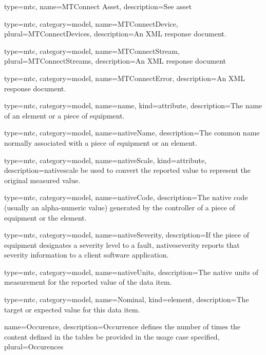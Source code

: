{
  type=mtc,
  name={MTConnect Asset},
  description={See \gls{asset}}
}


{
  type=mtc,
  category=model,
  name={MTConnectDevice},
  plural={MTConnectDevices},
  description={An XML response document.}
}


{
  type=mtc,
  category=model,
  name={MTConnectStream},
  plural={MTConnectStreams},
  description={An XML response document}
}

{
  type=mtc,
  category=model,
  name={MTConnectError},
  description={An XML response document.}
}


{
  type=mtc,
  category=model,
  name={name},
  kind={attribute},
  description={The name of an element or a piece of equipment.}
}


{
  type=mtc,
  category=model,
  name={nativeName},
  description={The common name normally associated with a piece of equipment or an element.}
}


{
  type=mtc,
  category=model,
  name={nativeScale},
  kind={attribute},
  description={\gls{nativescale} \MAY be used to convert the reported value to represent the original measured value.}
}


{
  type=mtc,
  category=model,
  name={nativeCode},
  description={The native code (usually an alpha-numeric value) generated by the controller of a piece of equipment or the element.}
}


{
  type=mtc,
  category=model,
  name={nativeSeverity},
  description={If the piece of equipment designates a severity level to a fault, \gls{nativeseverity} reports that severity information to a client software application. }
}


{
  type=mtc,
  category=model,
  name={nativeUnits},
  description={The native units of measurement for the reported value of the data item.}
}



{
  type=mtc,
  category=model,
  name={Nominal},
  kind={element},
  description={The target or expected value for this data item.}
}


{
  name={Occurence},
  description={Occurrence defines the number of times the content defined in the tables \MAY be provided in the usage case specified},
  plural={Occurences}
}


